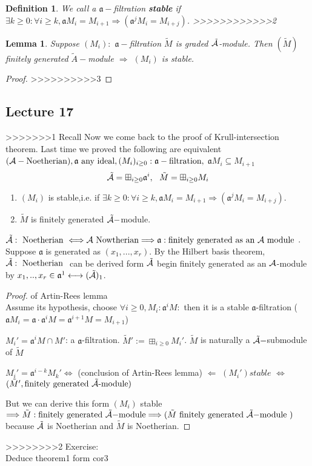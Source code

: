 \documentclass[11pt]{article}
\newtheorem{lemma}[thm]{Lemma}
\newtheorem{dfn}[thm]{Definition}
\newcommand{\sca}{{\mathfrak a}}
\newcommand{\cala}{{\cal A}}
\newcommand{\Lrta}{\Longrightarrow}
\newcommand{\llrta}{\longleftrightarrow}
\newcommand{\Llta}{\Longleftarrow}
\newcommand{\Llrta}{\Longleftrightarrow}
\begin{document}
\begin{dfn}
We call a $\sca-$filtration \textbf{stable} if $\exists k\geq 0:\forall i\geq k,\sca M_i=M_{i+1}\Lrta(\sca^j M_i=M_{i+j})$.
>>>>>>>>>>>>2
\end{dfn}

\begin{lemma}
Suppose $(M_i):$ $\sca-$filtration $\tilde{M}$ is graded $\tilde{\cala}$-module. Then $(\tilde{M})$ finitely generated $\tilde{A}-$module $\Lrta$ $(M_i)$ is stable.
\end{lemma}
\begin{proof}
>>>>>>>>>>3
\end{proof}

\subsection{Lecture 17}
>>>>>>>1 Recall
Now we come back to the proof of Krull-intersection theorem. Last time we proved the following are equivalent $(\cala-\text{Noetherian}), \sca\text{ any ideal}, (M_i)_{i\geq 0}:\sca-\text{filtration}, $ $\sca M_i\subseteq M_{i+1}$\\
$$
\tilde{\cala}=\boxplus_{i\geq 0}\sca^i,\ \  \tilde{M}=\boxplus_{i\geq 0} M_i
$$ 
\begin{enumerate}[label=(\roman*)]
\item $(M_i)$ is stable,i.e.  if $\exists k\geq 0:\forall i\geq k,\sca M_i=M_{i+1}\Lrta(\sca^j M_i=M_{i+j})$.
\item $\tilde{M}$ is finitely generated $\tilde{\cala}-$module.
\end{enumerate}
$\tilde{\cala}:\text{ Noetherian }\Llrta \cala \text{ Nowtherian}\Lrta \sca: \text{finitely generated as an $\cala$ module }$. Suppose $\sca$ is generated as $(x_1,...,x_r)$. By the Hilbert basis theorem, $\tilde{\cala}:\text{ Noetherian }$ can be derived form $\tilde{\cala}$ begin finitely generated as an $\cala$-module by $x_1,..,x_r\in\sca^1\llrta (\tilde{\cala})_1$.

\begin{proof} of Artin-Rees lemma\\
Assume its hypothesis, choose $\forall i\geq 0, M_i:\sca^i M:$ then it is a stable $\sca$-filtration ($\sca M_i=\sca\cdot \sca^i M=\sca^{i+1}M=M_{i+1}$)

$M_i'=\sca^i M\cap M'$: a $\sca$-filtration. $\tilde{M}':=\boxplus_{i\geq 0}M_i'$. $\tilde{M}$ is naturally a $\tilde{\cala}-$submodule of $\tilde{M}$

$M_i'=\sca^{i-k}M_k'\Llrta $ (conclusion of Artin-Rees lemma) $\Llta$ $(M_i') stable$ $\Llrta$ $(\tilde{M}',\text{finitely generated $\tilde{\cala}$-module})$

But we can derive this form $(M_i)$ stable $\Lrta\tilde{M}:\text{finitely generated $\tilde{\cala}-$module}\Lrta (\tilde{M}\text{ finitely generated $\tilde{\cala}-$module })$ because $\tilde{\cala}$ is Noetherian and $\tilde{M}$ is Noetherian.
\end{proof}
>>>>>>>>2
Exercise:\\
Deduce theorem1 form cor3
\end{document}
